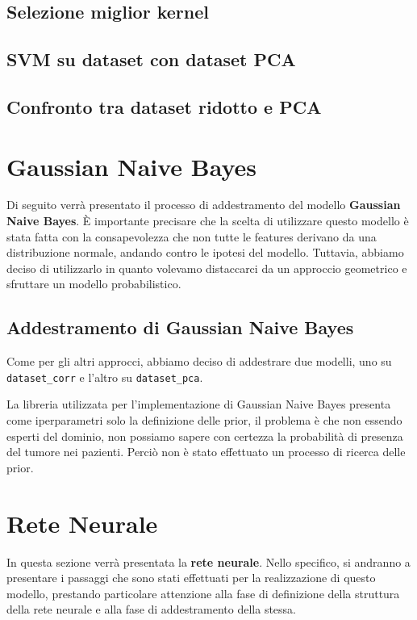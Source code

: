    \subsection{Selezione miglior kernel}
    \subsection{SVM su dataset con dataset PCA}
    \subsection{Confronto tra dataset ridotto e PCA}

\section{Gaussian Naive Bayes}
Di seguito verrà presentato il processo di addestramento del modello
\textbf{Gaussian Naive Bayes}. È importante precisare che la scelta di utilizzare
questo modello è stata fatta con la consapevolezza che non tutte le features
derivano da una distribuzione normale, andando contro le ipotesi del modello.
Tuttavia, abbiamo deciso di utilizzarlo in quanto volevamo distaccarci da un
approccio geometrico e sfruttare un modello probabilistico.
\subsection{Addestramento di Gaussian Naive Bayes}
Come per gli altri approcci, abbiamo deciso di addestrare due modelli, uno su
\texttt{dataset\_corr} e l'altro su \texttt{dataset\_pca}.

La libreria utilizzata per l'implementazione di Gaussian Naive Bayes
presenta come iperparametri solo la definizione delle prior, il problema è che non
essendo esperti del dominio, non possiamo sapere con certezza la probabilità 
di presenza del tumore nei pazienti. Perciò non è stato effettuato un processo di 
ricerca delle prior.

\section{Rete Neurale}
In questa sezione verrà presentata la \textbf{rete neurale}. Nello specifico, si
andranno a presentare i passaggi che sono stati effettuati per la realizzazione
di questo modello, prestando particolare attenzione alla fase di definizione
della struttura della rete neurale e alla fase di addestramento della stessa.

